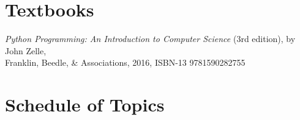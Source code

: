 \documentclass{article}
\begin{document}
    \section*{Textbooks}

        \emph{Python Programming: An Introduction to Computer Science}
            (3rd edition), by John Zelle, \\
            \indent \indent Franklin, Beedle, \& Associations, 2016, ISBN-13 9781590282755



    \section*{Schedule of Topics}
\end{document}
